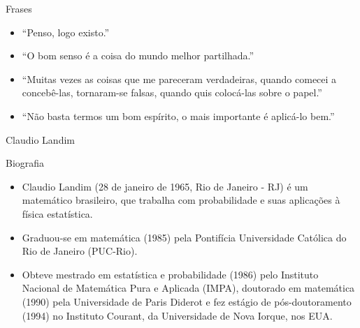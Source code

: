 \documentclass{beamer}
\begin{document}
\begin{frame}
    \begin{alertblock}{Frases}
        \begin{itemize}
            \item “Penso, logo existo.”
            \item “O bom senso é a coisa do mundo melhor partilhada.”
            \item “Muitas vezes as coisas que me pareceram verdadeiras, quando comecei a concebê-las, tornaram-se falsas, quando quis colocá-las sobre o papel.”
            \item “Não basta termos um bom espírito, o mais importante é aplicá-lo bem.”
        \end{itemize}
    \end{alertblock}  
\end{frame}




\begin{frame}{Claudio Landim}
    \begin{block}{Biografia}
        \begin{itemize}
            \item Claudio Landim (28 de janeiro de 1965, Rio de Janeiro - RJ) é um matemático brasileiro, que trabalha com probabilidade e suas aplicações à física estatística.
            \item Graduou-se em matemática (1985) pela Pontifícia Universidade Católica do Rio de Janeiro (PUC-Rio). \item Obteve mestrado em estatística e probabilidade (1986) pelo Instituto Nacional de Matemática Pura e Aplicada (IMPA), doutorado em matemática (1990) pela Universidade de Paris Diderot e fez estágio de pós-doutoramento (1994) no Instituto Courant, da Universidade de Nova Iorque, nos EUA. 
        \end{itemize}
    \end{block}
\end{frame}


\end{document}
